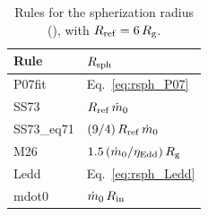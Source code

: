 \begin{table}
\centering
\caption{Rules for the spherization radius (), with $R_{\rm ref} = 6\,R_{\rm g}$.}
\label{tab:rsph}
\small
\begin{tabular}{@{}ll@{}}
\toprule
Rule & $R_{\rm sph}$ \\
\midrule
P07fit & Eq.~\eqref{eq:rsph_P07} \\
SS73 & $R_{\rm ref}\,\dot m_0$
\\
SS73\_eq71 & $(9/4)\,R_{\rm ref}\,\dot m_0$ \\
M26 & $1.5\,(\dot m_0/\eta_{\rm Edd})\,R_{\rm g}$ \\
Ledd & Eq.~\eqref{eq:rsph_Ledd} \\
mdot0 & $\dot m_0\,R_{\rm in}$ \\
\bottomrule
\end{tabular}
\end{table}
